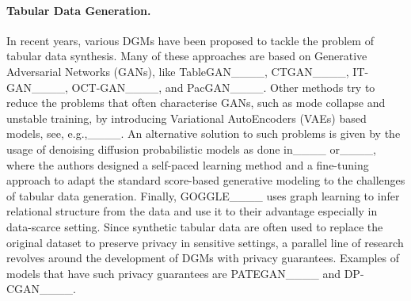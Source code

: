 \paragraph{Tabular Data Generation.} In recent years, various DGMs have been proposed to tackle the problem of tabular data synthesis. Many of these approaches are based on Generative Adversarial Networks (GANs), like TableGAN____, CTGAN____, IT-GAN____, OCT-GAN____, and PacGAN____.
Other methods try to reduce the problems that often characterise GANs, such as mode collapse and unstable training, by introducing Variational AutoEncoders (VAEs) based models, see, e.g.,____. An alternative solution to such problems is given by the usage of denoising diffusion probabilistic models as done in____ or____, where the authors designed a self-paced learning method and a fine-tuning approach to adapt the standard score-based generative modeling to the challenges of tabular data generation. Finally, GOGGLE____ uses graph learning to infer relational structure from the data and use it to their advantage especially in data-scarce setting. Since synthetic tabular data are often used to replace the original dataset to preserve privacy in sensitive settings, a parallel line of research revolves around the development of DGMs with privacy guarantees. Examples of models that have such privacy guarantees are PATEGAN____  and DP-CGAN____.
